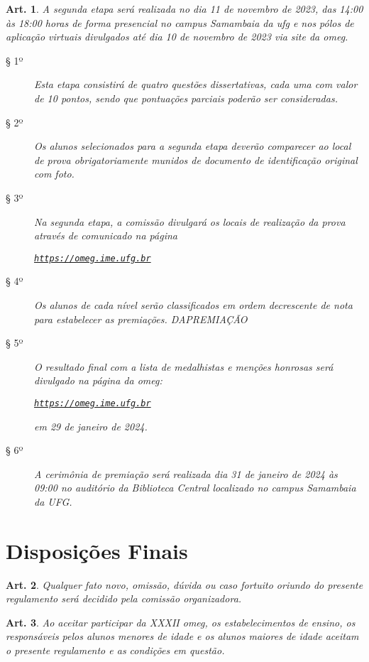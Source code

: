 \documentclass[a4paper,12pt]{article}
\newtheorem{article}{Art.}
\def\url{https://omeg.ime.ufg.br}
\def\homepage{\href{\url}{\texttt{\url}}}
\def\currentEdition{XXXII}
\def\year{2023}
\def\phaseTwo{11 de novembro de \year}
\def\remoteBasesDisclosureDate{10 de novembro de \year}
\def\resultsFromPhaseTwo{29 de janeiro de 2024}
\def\prizesDay{31 de janeiro de 2024}
\begin{document}
\begin{article}
  A segunda etapa será realizada no dia \phaseTwo, das 14:00 às 18:00 horas
  de forma presencial no campus Samambaia da \acrshort{ufg} e nos pólos de
  aplicação virtuais divulgados até dia \remoteBasesDisclosureDate{} via site
  da \acrshort{omeg}.
  \begin{description}
    \item[§ 1º]
      Esta etapa consistirá de quatro questões dissertativas, cada uma com
      valor de 10 pontos, sendo que pontuações parciais poderão ser
      consideradas.
    \item[§ 2º]
      Os alunos selecionados para a segunda etapa deverão comparecer ao
      local de prova obrigatoriamente munidos de documento de identificação
      original com foto.
    \item[§ 3º]
      Na segunda etapa, a comissão divulgará os locais de realização da prova
      através de comunicado na página
      \begin{center}
        \homepage
      \end{center}
    \item[§ 4º]
      Os alunos de cada nível serão classificados em ordem decrescente de
      nota para estabelecer as premiações.
      DAPREMIAÇÃO
    \item[§ 5º]
      O resultado final com a lista de medalhistas e menções honrosas será
      divulgado na página da \acrshort{omeg}:
      \begin{center}
        \homepage
      \end{center}
      em \resultsFromPhaseTwo.
    \item[§ 6º]
      A cerimônia de premiação será realizada dia \prizesDay{} às 09:00 no
      auditório da Biblioteca Central localizado no campus Samambaia da UFG.
  \end{description}
\end{article}

\section*{Disposições Finais}

\begin{article}
  Qualquer fato novo, omissão, dúvida ou caso fortuito oriundo do presente
  regulamento será decidido pela comissão organizadora.
\end{article}

\begin{article}
  Ao aceitar participar da \currentEdition{} \acrshort{omeg}, os
  estabelecimentos de ensino, os responsáveis pelos alunos menores de idade e
  os alunos maiores de idade aceitam o presente regulamento e as condições em
  questão.
\end{article}
\end{document}
